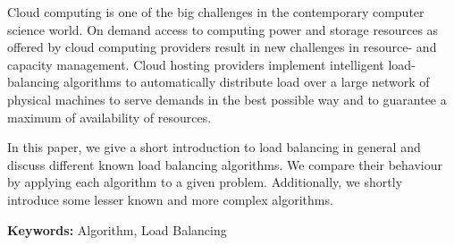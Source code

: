 Cloud computing is one of the big challenges in the contemporary computer
science world.
On demand access to computing power and storage resources
as offered by cloud computing providers result in new challenges in resource-
and capacity management.
Cloud hosting providers implement intelligent load-balancing algorithms to
automatically
distribute load over a large network of physical machines to serve demands in
the best possible way and to guarantee a maximum of availability of resources.

In this paper, we give a short introduction to load balancing in general and
discuss different known load balancing algorithms.
We compare their behaviour by applying each algorithm to a given problem.
Additionally, we shortly introduce some lesser known and more complex
algorithms.

\textbf{Keywords:} Algorithm, Load Balancing
